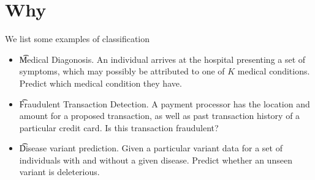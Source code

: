 
\section*{Why}

We list some examples of classification

\begin{itemize}
  \item \t{Medical Diagonosis}.
An individual arrives at the hospital presenting a set of symptoms, which may possibly be attributed to one of $K$ medical conditions. Predict which medical condition they have.
  \item \t{Fraudulent Transaction Detection}.
A payment processor has the location and amount for a proposed transaction, as well as past transaction history of a particular credit card. Is this transaction fraudulent?
  \item \t{Disease variant prediction}.
Given a particular variant data for a set of individuals with and without a given disease. Predict whether an unseen variant is deleterious.
\end{itemize}
\blankpage